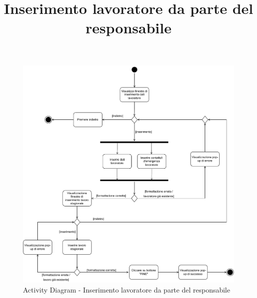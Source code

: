 \documentclass[a4paper,11pt]{article}
\begin{document}
\newpage


\begin{center}
	\title{\textbf{Inserimento lavoratore da parte del responsabile}}
	\maketitle
\end{center}
\begin{figure}[htpb]
	\centering
	\includegraphics[width=1\textwidth]{diagrams/Activity_Diagram_-_Inserimento_dati_lavoratori.pdf}
	\caption{Activity Diagram - Inserimento lavoratore da parte del responsabile}
	\label{fig:act_dia_ins_lav}
\end{figure}


\newpage
\end{document}
